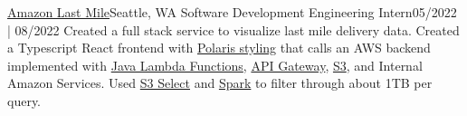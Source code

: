 \resumeSubheading
{\href{https://www.amazon.jobs/en/teams/last-mile}{Amazon Last Mile}}{Seattle, WA}
{Software Development Engineering Intern}{05/2022 | 08/2022}
\resumeItemListStart
{}
{Created a full stack service to visualize last mile delivery data. Created a Typescript React frontend with \href{https://github.com/Shopify/polaris}{Polaris styling} that calls an AWS backend implemented with \href{https://docs.aws.amazon.com/lambda/latest/dg/lambda-java.html}{Java Lambda Functions}, \href{https://aws.amazon.com/api-gateway/}{API Gateway}, \href{https://aws.amazon.com/s3/}{S3}, and Internal Amazon Services. Used \href{https://docs.aws.amazon.com/AmazonS3/latest/userguide/selecting-content-from-objects.html}{S3 Select} and \href{https://spark.apache.org/}{Spark} to filter through about 1TB per query.}
\resumeItemListEnd
